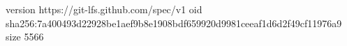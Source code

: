 version https://git-lfs.github.com/spec/v1
oid sha256:7a400493d22928be1aef9b8e1908bdf659920d9981ceeaf1d6d2f49cf11976a9
size 5566
